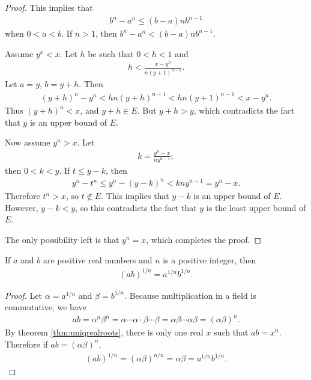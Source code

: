 \documentclass[12pt]{article}
\begin{document}
\begin{thm}
\begin{proof}
    This implies that
    \begin{align*}
      b^n - a^n \leq (b - a)nb^{n-1}
    \end{align*}
    when $0 < a < b$. If $n > 1$, then $b^n - a^n < (b - a)nb^{n-1}$.

    Assume $y^x < x$. Let $h$ be such that $0 < h < 1$ and
    \begin{align*}
      h < \frac{x - y^n}{n(y + 1)^{n-1}}.
    \end{align*}
    Let $a = y$, $b = y + h$. Then
    \begin{align*}
      (y + h)^n - y^n < hn(y + h)^{n - 1} < hn(y + 1)^{n - 1} < x - y^n.
    \end{align*}
    Thus $(y + h)^n < x$, and $y + h \in E$. But $y + h > y$, which contradicts the
    fact that $y$ is an upper bound of $E$.

    Now assume $y^n > x$. Let
    \begin{align*}
      k = \frac{y^n - x}{ny^{n-1}};
    \end{align*}
    then $0 < k < y$. If $t \leq y - k$, then
    \begin{align*}
      y^n - t^n \leq y^n - (y - k)^n < kny^{n - 1} = y^n - x.
    \end{align*}
    Therefore $t^n > x$, so $t \notin E$. This implies that $y - k$ is an upper bound
    of $E$. However, $y - k < y$, so this contradicts the fact that $y$ is the least
    upper bound of $E$.

    The only possibility left is that $y^n = x$, which completes the proof.
  \end{proof}
\end{thm}

\begin{cor}
  If $a$ and $b$ are positive real numbers and $n$ is a positive integer, then
  \begin{align*}
    (ab)^{1/n} = a^{1/n}b^{1/n}.
  \end{align*}

  \begin{proof}
    Let $\alpha = a^{1/n}$ and $\beta = b^{1/n}$. Because multiplication in a field
    is commutative, we have
    \begin{align*}
      ab = \alpha^n\beta^n = \alpha \cdots \alpha \cdot \beta \cdots \beta =
      \alpha\beta \cdots \alpha\beta = (\alpha\beta)^n.
    \end{align*}
    By theorem \ref{thm:uniqrealroots}, there is only one real $x$ such that $ab =
    x^n$. Therefore if $ab = (\alpha\beta)^n$,
    \begin{align*}
      (ab)^{1/n} = (\alpha\beta)^{n/n} = \alpha\beta = a^{1/n}b^{1/n}.
    \end{align*}
  \end{proof}
\end{cor}
\end{document}
